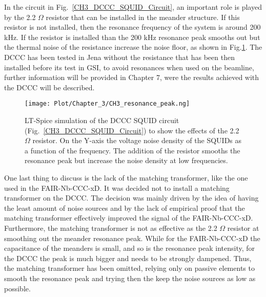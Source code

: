 \documentclass[12pt,a4paper]{report}
\begin{document}
       In the circuit in Fig.~\ref{CH3_DCCC_SQUID_Circuit}, an important role is played by the 2.2 $\Omega$ resistor that can be installed in the meander structure. If this resistor is not installed, then the resonance frequency of the system is around 200 kHz. If the resistor is installed than the 200 kHz resonance peak smooths out but the thermal noise of the resistance increase the noise floor, as shown in Fig.\ref{CH3_DCCC_resonance}. The DCCC has been tested in Jena without the resistance that has been then installed before its test in GSI, to avoid resonances when used on the beamline, further information will be provided in Chapter 7, were the results achieved with the DCCC will be described.\\
       \begin{figure}[H]
       	\centering
       	\texttt{[image: Plot/Chapter\_3/CH3\_resonance\_peak.ng]}
       	\caption{\small{LT-Spice simulation of the DCCC SQUID circuit (Fig.~\ref{CH3_DCCC_SQUID_Circuit}) to show the effects of the 2.2 $\Omega$ resistor. On the Y-axis the voltage noise density of the SQUIDs as a function of the frequency. The addition of the resistor smooths the resonance peak but increase the noise density at low frequencies.}}
       	\label{CH3_DCCC_resonance}
       \end{figure}
       One last thing to discuss is the lack of the matching transformer, like the one used in the FAIR-Nb-CCC-xD. It was decided not to install a matching transformer on the DCCC. The decision was mainly driven by the idea of having the least amount of noise sources and by the lack of empirical proof that the matching transformer effectively improved the signal of the FAIR-Nb-CCC-xD. Furthermore, the matching transformer is not as effective as the 2.2 $\Omega$ resistor at smoothing out the meander resonance peak. While for the FAIR-Nb-CCC-xD the capacitance of the meanders is small, and so is the resonance peak intensity, for the DCCC the peak is much bigger and needs to be strongly dampened. Thus, the matching transformer has been omitted, relying only on passive elements to smooth the resonance peak and trying then the keep the noise sources as low as possible.
       
\end{document}
